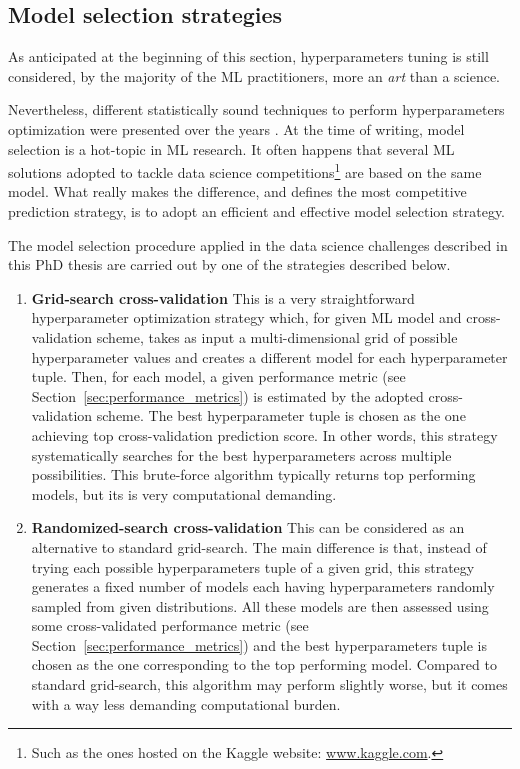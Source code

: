   
  \subsection{Model selection strategies} \label{sec:model_selection}
  As anticipated at the beginning of this section, hyperparameters tuning is still considered, by the majority of the ML practitioners, more an \textit{art} than a science.
  
  Nevertheless, different statistically sound techniques to perform hyperparameters optimization were presented over the years . At the time of writing, model selection is a hot-topic in ML research. It often happens that several ML solutions adopted to tackle data science competitions\footnote{ Such as the ones hosted on the Kaggle website: \url{www.kaggle.com}.} are based on the same model. What really makes the difference, and defines the most competitive prediction strategy, is to adopt an efficient and effective model selection strategy.
  
  The model selection procedure applied in the data science challenges described in this PhD thesis are carried out by one of the strategies described below.
  
  \begin{enumerate}
  	\item[] \textbf{Grid-search cross-validation} This is a very straightforward hyperparameter optimization strategy which, for given ML model and cross-validation scheme, takes as input a multi-dimensional grid of possible hyperparameter values and creates a different model for each hyperparameter tuple. Then, for each model, a given performance metric (see Section~\ref{sec:performance_metrics}) is estimated by the adopted cross-validation scheme.
  	The best hyperparameter tuple is chosen as the one achieving top cross-validation prediction score.
  	In other words, this strategy systematically searches for the best hyperparameters across multiple possibilities. 
  	This brute-force algorithm typically returns top performing models, but its is very computational demanding.
  	
 	\item[] \textbf{Randomized-search cross-validation} This can be considered as an alternative to standard grid-search. The main difference is that, instead of trying each possible hyperparameters tuple of a given grid, this strategy generates a fixed number of models each having hyperparameters randomly sampled from given distributions. All these models are then assessed using some cross-validated performance metric (see Section~\ref{sec:performance_metrics}) and the best hyperparameters tuple is chosen as the one corresponding to the top performing model.
 	Compared to standard grid-search, this algorithm may perform slightly worse, but it comes with a way less demanding computational burden.
  \end{enumerate}

